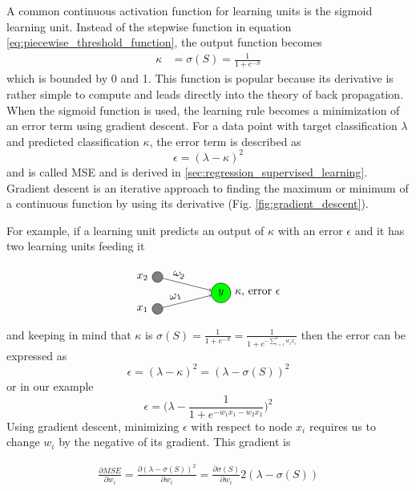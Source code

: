 A common continuous activation function for learning units is the sigmoid learning unit. Instead of the stepwise function in equation \ref{eq:piecewise_threshold_function}, the output function becomes
\begin{align}
  \kappa &= \sigma(S) = \frac{1}{1+e^{-S}}
\end{align}
which is bounded by 0 and 1. This function is popular because its derivative is rather simple to compute and leads directly into the theory of back propagation. When the sigmoid function is used, the learning rule becomes a minimization of an error term using gradient descent. For a data point with target classification $\lambda$ and predicted classification $\kappa$, the error term is described as
$$ \epsilon = (\lambda- \kappa)^2 $$
and is called MSE and is derived in \ref{sec:regression_supervised_learning}. Gradient descent is an iterative approach to finding the maximum or minimum of a continuous function by using its derivative (Fig. \ref{fig:gradient_descent}).


For example, if a learning unit predicts an output of $\kappa$ with an error $\epsilon$ and it has two learning units feeding it


\begin{align*}
  \begin{tikzpicture}
    [   cnode/.style={draw=black,fill=#1,minimum width=3mm,circle},
    ]
        \node[cnode=green,label=0:{$\kappa$, error $\epsilon$}] (s) at (2,-1.5) {$y$};
        \foreach \x in {1,...,2}
        {   \pgfmathparse{\x}
            \node[cnode=gray,label=180:$x_{\pgfmathresult}$] (x-\x) at (0,\x-3) {};
            \draw[->] (x-\x) -- node[above,sloped,pos=0.3] {$\omega_{\pgfmathresult}$} (s);
        }
  \end{tikzpicture}
\end{align*}
and keeping in mind that $\kappa$ is $\sigma(S) = \frac{1}{1+e^{-S}} = \frac{1}{1+e^{-\sum_{i=1}^n w_ix_i}}$ then the error can be expressed as 
$$ \epsilon = (\lambda - \kappa)^2  =  (\lambda - \sigma(S))^2$$ 
or in our example  
$$ \epsilon = \Big(\lambda - \frac{1}{1+e^{-w_1x_1-w_2x_2}}\Big)^2$$
Using gradient descent, minimizing $\epsilon$ with respect to node $x_i$ requires us to change $w_i$ by the negative of its gradient. This gradient is 

\begin{align}
  \frac{\partial MSE}{\partial w_i} = \frac{\partial(\lambda - \sigma(S))^2}{\partial w_i}  = \frac{\partial\sigma(S)}{\partial w_i}2(\lambda - \sigma(S))
  \label{eq:gradient_descent_on_sigma}
\end{align}

